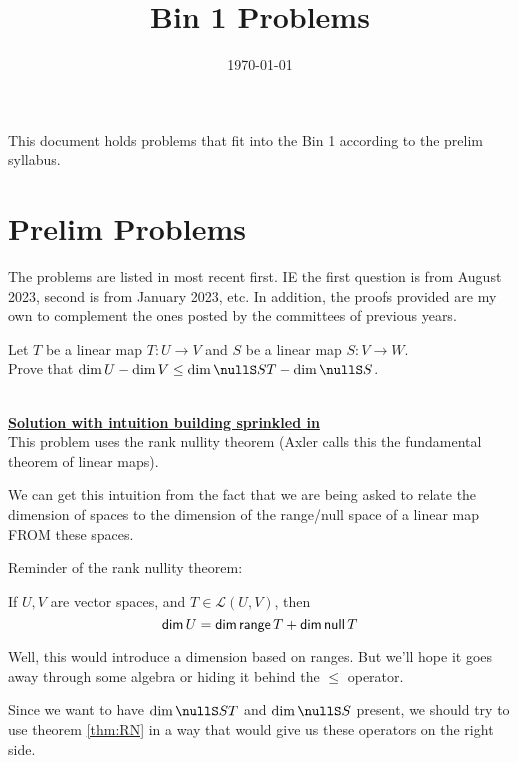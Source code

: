 \documentclass[answers]{exam}
\title{Bin 1 Problems}
\date{\today}
\author{}
\begin{document}
\maketitle
This document holds problems that fit into the Bin 1 according to the prelim syllabus. 

\tableofcontents

\section{Prelim Problems}
The problems are listed in most recent first. IE the first question is from August 2023, second is from January 2023, etc. In addition, the proofs provided are my own to complement the ones posted by the committees of previous years.
\begin{questions}
    \question Let $T$ be a linear map $T:U\rightarrow V$ and $S$ be a linear map $S:V\rightarrow W$.\\
    Prove that $\dim U-\dim V \leq \dim\nullS ST - \dim\nullS S$.
    \begin{solution}\,\\
        \underline{\textbf{Solution with intuition building sprinkled in}}\\
        This problem uses the rank nullity theorem (Axler calls this the fundamental theorem of linear maps).

        We can get this intuition from the fact that we are being asked to relate the dimension of spaces to the dimension of the range/null space of a linear map FROM these spaces.

        Reminder of the rank nullity theorem:
        \begin{theorem}\label{thm:RN}
            If $U,V$ are vector spaces, and $T\in\mathcal{L}\left(U,V\right)$, then
            \begin{equation}\label{eq:RN}
                \mathsf{dim}\, U = \mathsf{dim}\,\mathsf{range}\, T + \mathsf{dim}\,\mathsf{null}\, T
            \end{equation}
        \end{theorem}

        Well, this would introduce a dimension based on ranges. But we'll hope it goes away through some algebra or hiding it behind the $\leq$ operator.

        Since we want to have $\dim\nullS ST$ and $\dim\nullS S$ present, we should try to use theorem \ref{thm:RN} in a way that would give us these operators on the right side.


\end{solution}
\end{questions}
\end{document}
